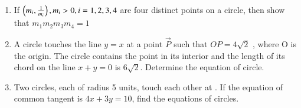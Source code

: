 \documentclass[journal,12pt,twocolumn]{IEEEtran}
\theoremstyle{remark}
\begin{document}
\begin{enumerate}
\hfill {}
\item If $\left( m_i, \frac{1}{m_i}\right), m_i > 0, i = 1, 2, 3, 4$ are four distinct points on a circle, then show that $m_1m_2m_3m_4=1$

\hfill {}
\item A circle touches the line $y=x$ at a point $\vec{P}$ such that $OP=4\sqrt{2}$ , where O is the origin. The circle contains the point  in its interior and the length of its chord on the line $x+y=0$ is $6\sqrt{2}$. Determine the equation of circle.

\hfill {}
\item Two circles, each of radius 5 units, touch each other at . If the equation of common tangent is $4x+3y=10$, find the equations of circles.

\hfill {}
\end{enumerate}
\end{document}
